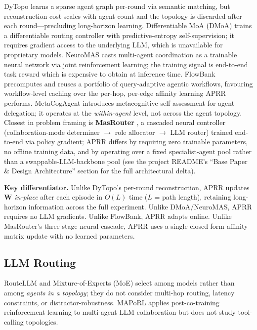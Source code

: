 \documentclass[journal,twocolumn,letterpaper]{IEEEtran}
\newcommand{\APRR}{\textsc{APRR}}
\newcommand{\WW}{\mathbf{W}}
\begin{document}
DyTopo \cite{lu2026dytopo} learns a sparse agent graph per-round via
semantic matching, but reconstruction cost scales with agent count and the
topology is discarded after each round---precluding long-horizon learning.
Differentiable MoA (DMoA) \cite{wu2026dmoa} trains a differentiable routing
controller with predictive-entropy self-supervision; it requires gradient
access to the underlying LLM, which is unavailable for proprietary models.
NeuroMAS \cite{lu2026neuromas} casts multi-agent coordination as a trainable
neural network via joint reinforcement learning; the training signal is
end-to-end task reward which is expensive to obtain at inference time.
FlowBank \cite{yu2026flowbank} precomputes and reuses a portfolio of
query-adaptive agentic workflows, favouring workflow-level caching over the
per-hop, per-edge affinity learning \APRR{} performs.  MetaCogAgent
\cite{metacogagent2026} introduces metacognitive self-assessment for agent
delegation; it operates at the \emph{within-agent} level, not across the
agent topology.  Closest in problem framing is \textbf{MasRouter}
\cite{yue2025masrouter}, a cascaded neural controller (collaboration-mode
determiner $\to$ role allocator $\to$ LLM router) trained end-to-end via
policy gradient; \APRR{} differs by requiring zero trainable parameters, no
offline training data, and by operating over a fixed specialist-agent pool
rather than a swappable-LLM-backbone pool (see the project README's
``Base Paper \& Design Architecture'' section for the full architectural
delta).

\textbf{Key differentiator.}  Unlike DyTopo's per-round reconstruction,
\APRR{} updates $\WW$ \emph{in-place} after each episode in $O(L)$ time ($L$
= path length), retaining long-horizon information across the full experiment.
Unlike DMoA/NeuroMAS, \APRR{} requires no LLM gradients.  Unlike FlowBank,
\APRR{} adapts online.  Unlike MasRouter's three-stage neural cascade,
\APRR{} uses a single closed-form affinity-matrix update with no learned
parameters.

\subsection{LLM Routing}

RouteLLM \cite{ong2024routellm} and Mixture-of-Experts (MoE)
\cite{shazeer2017moe} select among models rather than among \emph{agents in a
topology}; they do not consider multi-hop routing, latency constraints, or
distractor-robustness.  MAPoRL \cite{park2025maporl} applies post-co-training
reinforcement learning to multi-agent LLM collaboration but does not study
tool-calling topologies.
\end{document}
